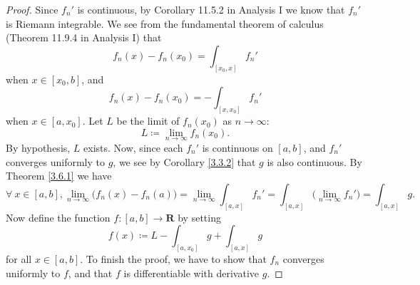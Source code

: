\begin{proof}
    Since \(f_n'\) is continuous, by Corollary 11.5.2 in Analysis I we know that \(f_n'\) is Riemann integrable.
    We see from the fundamental theorem of calculus (Theorem 11.9.4 in Analysis I) that
    \[
        f_n(x) - f_n(x_0) = \int_{[x_0, x]} f_n'
    \]
    when \(x \in [x_0, b]\), and
    \[
        f_n(x) - f_n(x_0) = -\int_{[x, x_0]} f_n'
    \]
    when \(x \in [a, x_0]\).
    Let \(L\) be the limit of \(f_n(x_0)\) as \(n \to \infty\):
    \[
        L \coloneqq \lim_{n \to \infty} f_n(x_0).
    \]
    By hypothesis, \(L\) exists.
    Now, since each \(f_n'\) is continuous on \([a, b]\), and \(f_n'\) converges uniformly to \(g\), we see by Corollary \ref{3.3.2} that \(g\) is also continuous.
    By Theorem \ref{3.6.1} we have
    \[
        \forall\ x \in [a, b], \lim_{n \to \infty} \big(f_n(x) - f_n(a)\big) = \lim_{n \to \infty} \int_{[a, x]} f_n' = \int_{[a, x]} \big(\lim_{n \to \infty} f_n'\big) = \int_{[a, x]} g.
    \]
    Now define the function \(f : [a, b] \to \mathbf{R}\) by setting
    \[
        f(x) \coloneqq L - \int_{[a, x_0]} g + \int_{[a, x]} g
    \]
    for all \(x \in [a, b]\).
    To finish the proof, we have to show that \(f_n\) converges uniformly to \(f\), and that \(f\) is differentiable with derivative \(g\).


\end{proof}
